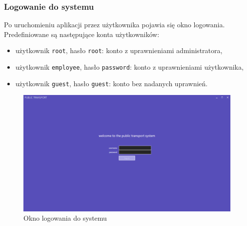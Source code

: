 \documentclass[10pt,a4paper]{article}
\begin{document}
\subsubsection{Logowanie do systemu}
Po uruchomieniu aplikacji przez użytkownika pojawia się okno logowania. Predefiniowane są następujące konta użytkowników:
\begin{itemize}
	\item użytkownik \texttt{root}, hasło \texttt{root}: konto z uprawnieniami administratora,
	\item użytkownik \texttt{employee}, hasło \texttt{password}: konto z uprawnieniami użytkownika,
	\item użytkownik \texttt{guest}, hasło \texttt{guest}: konto bez nadanych uprawnień.
\end{itemize}
\begin{figure}[H]
	\centering
	\includegraphics[width=15cm]{Resources/Images/01_login_screen.png}
	\caption{Okno logowania do systemu}
\end{figure}
\end{document}
